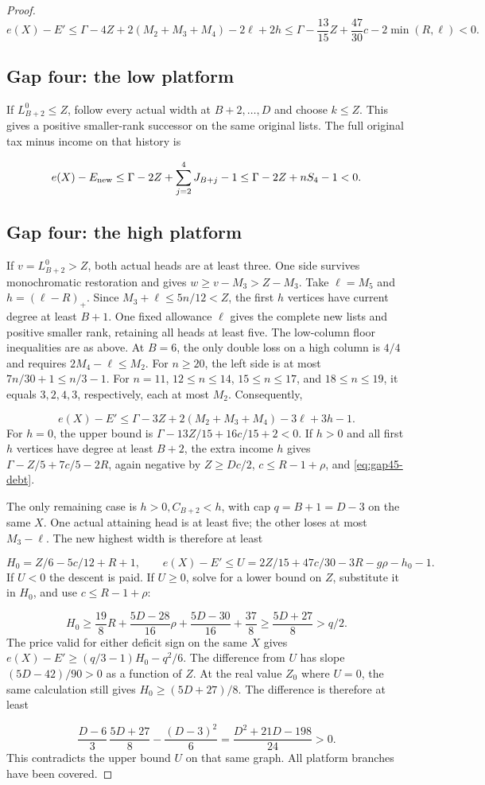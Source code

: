\documentclass[11pt,a4paper]{article}
\theoremstyle{definition}
\begin{document}
\begin{proof}
\[
e(X)-E'\le\Gamma-4Z+2(M_2+M_3+M_4)-2\ell+2h
\le\Gamma-\frac{13}{15}Z+\frac{47}{30}c-2\min(R,\ell)<0.
\]
\subsection*{Gap four: the low platform}
If $L_{B+2}^0\le Z$, follow every actual width at $B+2,\ldots,D$
and choose $k\le Z$. This gives a positive smaller-rank successor on the same original lists.
The full original tax minus income on that history is

\[
e(X)-E_{\rm new}\le\Gamma-2Z+\sum_{j=2}^{4}J_{B+j}-1
\le\Gamma-2Z+nS_4-1<0.
\]
\subsection*{Gap four: the high platform}
If $v=L_{B+2}^0>Z$, both actual heads are at least three.
One side survives monochromatic restoration and gives
$w\ge v-M_3>Z-M_3$.
Take $\ell=M_5$ and $h=(\ell-R)_+$.
Since $M_3+\ell\le5n/12<Z$, the first $h$ vertices have current degree at least $B+1$.
One fixed allowance $\ell$ gives the complete new lists and positive smaller rank,
retaining all heads at least five.
The low-column floor inequalities are as above.
At $B=6$, the only double loss on a high column is $4/4$ and requires
$2M_4-\ell\le M_2$.
For $n\ge20$, the left side is at most $7n/30+1\le n/3-1$.
For $n=11$, $12\le n\le14$, $15\le n\le17$, and $18\le n\le19$,
it equals $3,2,4,3$, respectively, each at most $M_2$.
Consequently,

\[
e(X)-E'\le\Gamma-3Z+2(M_2+M_3+M_4)-3\ell+3h-1.
\]
For $h=0$, the upper bound is
$\Gamma-13Z/15+16c/15+2<0$.
If $h>0$ and all first $h$ vertices have degree at least $B+2$,
the extra income $h$ gives $\Gamma-Z/5+7c/5-2R$,
again negative by $Z\ge Dc/2$, $c\le R-1+\rho$, and \eqref{eq:gap45-debt}.

The only remaining case is $h>0,C_{B+2}<h$, with cap $q=B+1=D-3$ on the same $X$.
One actual attaining head is at least five; the other loses at most $M_3-\ell$.
The new highest width is therefore at least

\[
H_0=Z/6-5c/12+R+1,\qquad
e(X)-E'\le U=2Z/15+47c/30-3R-g\rho-h_0-1.
\]
If $U<0$ the descent is paid.
If $U\ge0$, solve for a lower bound on $Z$, substitute it in $H_0$,
and use $c\le R-1+\rho$:

\[
H_0\ge\frac{19}8R+\frac{5D-28}{16}\rho+
\frac{5D-30}{16}+\frac{37}8
\ge\frac{5D+27}{8}>q/2.
\]
The price valid for either deficit sign on the same $X$ gives
$e(X)-E'\ge(q/3-1)H_0-q^2/6$.
The difference from $U$ has slope $(5D-42)/90>0$ as a function of $Z$.
At the real value $Z_0$ where $U=0$, the same calculation still gives
$H_0\ge(5D+27)/8$.
The difference is therefore at least

\[
\frac{D-6}{3}\,\frac{5D+27}{8}-\frac{(D-3)^2}{6}
=\frac{D^2+21D-198}{24}>0.
\]
This contradicts the upper bound $U$ on that same graph.
All platform branches have been covered.
\end{proof}
\end{document}
